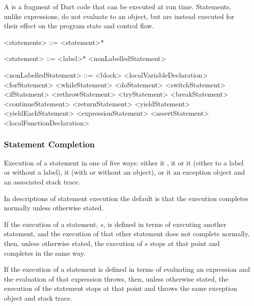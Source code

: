 \documentclass[makeidx]{article}
\begin{document}
{\LMHash{}%
A  is a fragment of Dart code that can be executed at run time.
Statements, unlike expressions, do not evaluate to an object,
but are instead executed for their effect on the program state and control flow.

\begin{grammar}
<statements> ::= <statement>*

<statement> ::= <label>* <nonLabelledStatement>

<nonLabelledStatement> ::= <block>
  \alt <localVariableDeclaration>
  \alt <forStatement>
  \alt <whileStatement>
  \alt <doStatement>
  \alt <switchStatement>
  \alt <ifStatement>
  \alt <rethrowStatement>
  \alt <tryStatement>
  \alt <breakStatement>
  \alt <continueStatement>
  \alt <returnStatement>
  \alt <yieldStatement>
  \alt <yieldEachStatement>
  \alt <expressionStatement>
  \alt <assertStatement>
  \alt <localFunctionDeclaration>
\end{grammar}


\subsubsection{Statement Completion}

\LMHash{}%
Execution of a statement 
in one of five ways:
either it
,
it 
or it 
(either to a label or without a label),
it  (with or without an object),
or it 
an exception object and an associated stack trace.

\LMHash{}%
In descriptions of statement execution the default is that
the execution completes normally unless otherwise stated.

\LMHash{}%
If the execution of a statement, $s$,
is defined in terms of executing another statement,
and the execution of that other statement does not complete normally,
then, unless otherwise stated, the execution of $s$ stops
at that point and completes in the same way.

\LMHash{}%
If the execution of a statement is defined in terms of evaluating an expression
and the evaluation of that expression throws,
then, unless otherwise stated, the execution of the statement stops
at that point and throws the same exception object and stack trace.

}
\end{document}
